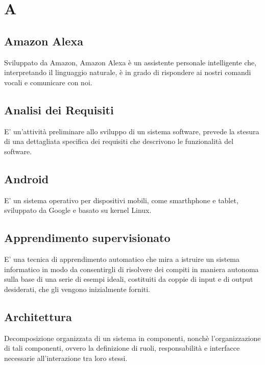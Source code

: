 \section*{A}

\subsection{Amazon Alexa}
Sviluppato da Amazon, Amazon Alexa è un assistente personale intelligente che, interpretando il linguaggio naturale, è in grado di rispondere ai nostri comandi vocali e comunicare con noi. 

\subsection{Analisi dei Requisiti}
E' un'attività preliminare allo sviluppo di un sistema software, prevede la stesura di una dettagliata specifica dei requisiti che descrivono le funzionalità del software.

\subsection{Android}
E' un sistema operativo per dispositivi mobili, come smarthphone e tablet, sviluppato da Google e basato su kernel Linux.

\subsection{Apprendimento supervisionato}
E' una tecnica di apprendimento automatico che mira a istruire un sistema informatico in modo da consentirgli di risolvere dei compiti in maniera autonoma sulla base di una serie di esempi ideali, costituiti da coppie di input e di output desiderati, che gli vengono inizialmente forniti.

\subsection{Architettura}
Decomposizione organizzata di un sistema in componenti, nonchè l'organizzazione di tali componenti, ovvero la definizione di ruoli, responsabilità e interfacce necessarie all'interazione tra loro stessi.